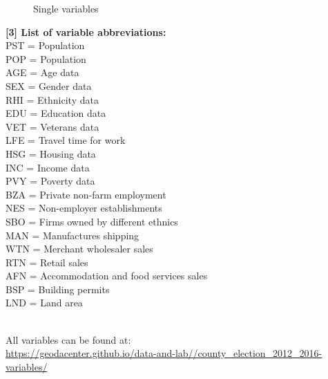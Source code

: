 \begin{figure}[H]
  \centering
  \hfill
   \caption{Single variables}
\end{figure}

\textbf{[3] List of variable abbreviations:}\\
PST = Population\\
POP = Population\\
AGE = Age data\\
SEX = Gender data\\
RHI = Ethnicity data\\
EDU = Education data\\
VET = Veterans data\\
LFE = Travel time for work\\
HSG = Housing data\\
INC = Income data\\
PVY = Poverty data\\
BZA = Private non-farm employment\\
NES = Non-employer establishments\\
SBO = Firms owned by different ethnics\\
MAN = Manufactures shipping\\
WTN = Merchant wholesaler sales\\
RTN = Retail sales\\
AFN = Accommodation and food services sales\\
BSP = Building permits\\
LND = Land area\\
\\
\par
All variables can be found at:\\
\url{https://geodacenter.github.io/data-and-lab//county_election_2012_2016-variables/} 
\\
\par

